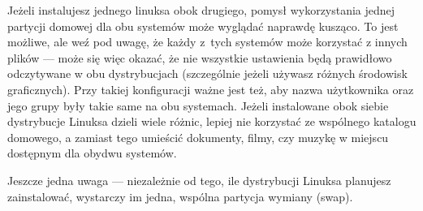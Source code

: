 Jeżeli instalujesz jednego linuksa obok drugiego, pomysł wykorzystania jednej partycji domowej dla obu systemów może wyglądać naprawdę kusząco. To jest możliwe, ale weź pod uwagę, że każdy z~tych systemów może korzystać z innych plików --- może się więc okazać, że nie wszystkie ustawienia będą prawidłowo odczytywane w obu dystrybucjach (szczególnie jeżeli używasz różnych środowisk graficznych). Przy takiej konfiguracji ważne jest też, aby nazwa użytkownika oraz jego grupy były takie same na obu systemach. Jeżeli instalowane obok siebie dystrybucje Linuksa dzieli wiele różnic, lepiej nie korzystać ze wspólnego katalogu domowego, a zamiast tego umieścić dokumenty, filmy, czy muzykę w miejscu dostępnym dla obydwu systemów.

Jeszcze jedna uwaga --- niezależnie od tego, ile dystrybucji Linuksa planujesz zainstalować, wystarczy im jedna, wspólna partycja wymiany (swap).
